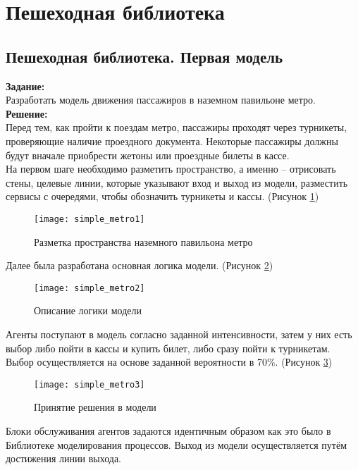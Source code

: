 \section*{Пешеходная библиотека}
\subsection*{Пешеходная библиотека. Первая модель}

\textbf{Задание:}\\
Разработать модель движения пассажиров в наземном павильоне метро.\\

\textbf{Решение:}\\
Перед тем, как пройти к поездам метро, пассажиры проходят через турникеты, проверяющие наличие проездного документа. Некоторые пассажиры должны будут вначале приобрести жетоны или проездные билеты в кассе.\\

На первом шаге необходимо разметить пространство, а именно -- отрисовать стены, целевые линии, которые указывают вход и выход из модели, разместить сервисы с очередями, чтобы обозначить турникеты и кассы. (Рисунок \ref{fig:simple_metro1})
\begin{figure}[h]
	\centering \texttt{[image: simple\_metro1]}
	\caption{Разметка пространства наземного павильона метро}
	\label{fig:simple_metro1}
\end{figure}

Далее была разработана основная логика модели. (Рисунок \ref{fig:simple_metro2})
\begin{figure}[h]
	\centering \texttt{[image: simple\_metro2]}
	\caption{Описание логики модели}
	\label{fig:simple_metro2}
\end{figure}

\newpage

Агенты поступают в модель согласно заданной интенсивности, затем у них есть выбор либо пойти в кассы и купить билет, либо сразу пойти к турникетам. Выбор осуществляется на основе заданной вероятности в 70\%. (Рисунок \ref{fig:simple_metro3})
\begin{figure}[h]
	\centering \texttt{[image: simple\_metro3]}
	\caption{Принятие решения в модели}
	\label{fig:simple_metro3}
\end{figure}

Блоки обслуживания агентов задаются идентичным образом как это было в Библиотеке моделирования процессов. Выход из модели осуществляется путём достижения линии выхода.\\

